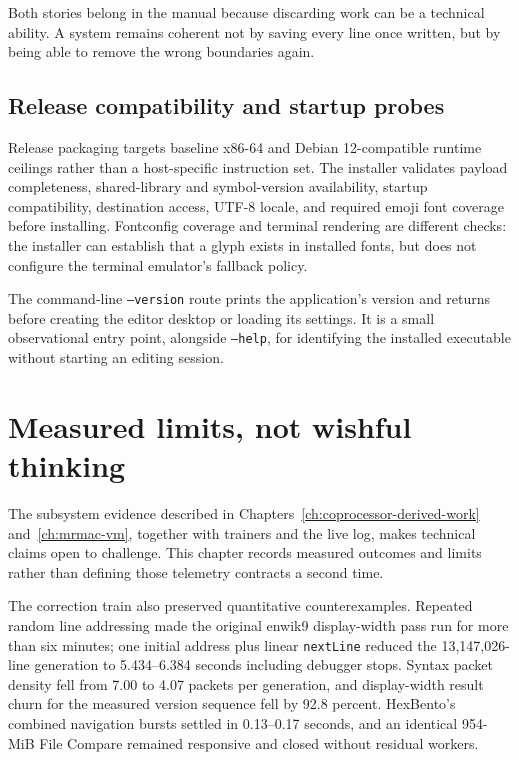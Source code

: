 \documentclass[a4paper,10pt,twoside,openany]{book}
\begin{document}
Both stories belong in the manual because discarding work can be a technical
ability. A system remains coherent not by saving every line once written, but
by being able to remove the wrong boundaries again.

\section{Release compatibility and startup probes}

Release packaging targets baseline x86-64 and Debian 12-compatible runtime
ceilings rather than a host-specific instruction set. The installer validates
payload completeness, shared-library and symbol-version availability, startup
compatibility, destination access, UTF-8 locale, and required emoji font
coverage before installing. Fontconfig coverage and terminal rendering are
different checks: the installer can establish that a glyph exists in installed
fonts, but does not configure the terminal emulator's fallback policy.

The command-line \texttt{--version} route prints the application's version and
returns before creating the editor desktop or loading its settings. It is a
small observational entry point, alongside \texttt{--help}, for identifying the
installed executable without starting an editing session.
\chapter{Measured limits, not wishful thinking}
\label{ch:measured-limits}

The subsystem evidence described in
Chapters~\ref{ch:coprocessor-derived-work} and~\ref{ch:mrmac-vm}, together with
trainers and the live log, makes technical claims open to challenge. This
chapter records measured outcomes and limits rather than defining those
telemetry contracts a second time.

The correction train also preserved quantitative counterexamples. Repeated
random line addressing made the original enwik9 display-width pass run for
more than six minutes; one initial address plus linear \texttt{nextLine}
reduced the 13,147,026-line generation to 5.434--6.384 seconds including
debugger stops. Syntax packet density fell from 7.00 to 4.07 packets per
generation, and display-width result churn for the measured version sequence
fell by 92.8 percent. HexBento's combined navigation bursts settled in
0.13--0.17 seconds, and an identical 954-MiB File Compare remained responsive
and closed without residual workers.
\end{document}
